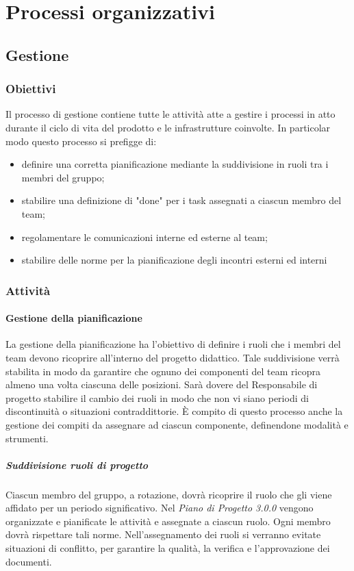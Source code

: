 \section{Processi organizzativi}

	\subsection{Gestione}
	\subsubsection{Obiettivi}
	Il processo di gestione contiene tutte le attività atte a gestire i processi in atto durante il ciclo di vita del prodotto e le infrastrutture coinvolte.
	In particolar modo questo processo si prefigge di:
	\begin{itemize}
		\item definire una corretta pianificazione mediante la suddivisione in ruoli tra i membri del gruppo;
		\item stabilire una definizione di "done" per i task assegnati a ciascun membro del team;
		\item regolamentare le comunicazioni interne ed esterne al team;
		\item stabilire delle norme per la pianificazione degli incontri esterni ed interni
	\end{itemize}

	\subsubsection{Attività}
	\paragraph{Gestione della pianificazione}
	La gestione della pianificazione ha l'obiettivo di definire i ruoli che i membri del team devono ricoprire all'interno del progetto didattico. Tale suddivisione verrà stabilita in modo da garantire che ognuno dei componenti del team ricopra almeno una volta ciascuna delle posizioni. Sarà dovere del Responsabile di progetto stabilire il cambio dei ruoli in modo che non vi siano periodi di discontinuità o situazioni contraddittorie. È compito di questo processo anche la gestione dei compiti da assegnare ad ciascun componente, definendone modalità e strumenti.

   		\subparagraph*{Suddivisione ruoli di progetto}
   			Ciascun membro del gruppo, a rotazione, dovrà ricoprire il ruolo che gli viene affidato per un periodo significativo. Nel \textit{Piano di Progetto 3.0.0\docs} vengono organizzate e pianificate le attività e assegnate a ciascun ruolo. Ogni membro dovrà rispettare tali norme.
   			Nell'assegnamento dei ruoli si verranno evitate situazioni di conflitto, per garantire la qualità, la verifica e l'approvazione dei documenti.

